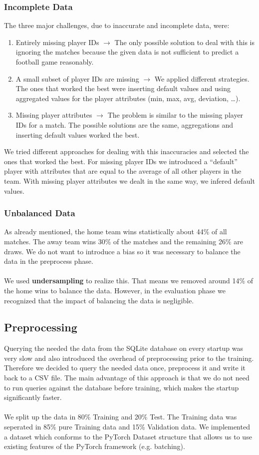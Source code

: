 \documentclass[a4paper]{article}
\begin{document}
\subsubsection{Incomplete Data}
The three major challenges, due to inaccurate and incomplete data, were:
\begin{enumerate}
  \item Entirely missing player IDs $\rightarrow$ The only possible solution to
  deal with this is ignoring the matches because the given data is not
  sufficient to predict a football game reasonably.
  \item A small subset of player IDs are missing $\rightarrow$ We applied
  different strategies. The ones that worked the best were inserting default
  values and using aggregated values for the player attributes (min, max, avg,
  deviation, \ldots).
  \item Missing player attributes $\rightarrow$ The problem is similar to the
  missing player IDs for a match. The possible solutions are the same,
  aggregations and inserting default values worked the best.
\end{enumerate}
We tried different approaches for dealing with this inaccuracies and selected
the ones that worked the best. For missing player IDs we introduced a
``default'' player with attributes that are equal to the average of all other
players in the team. With missing player attributes we dealt in the same way, we
infered default values.

\subsubsection{Unbalanced Data}
As already mentioned, the home team wins statistically about 44\% of all
matches. The away team wins 30\% of the matches and the remaining 26\% are
draws. We do not want to introduce a bias so it was necessary to balance the
data in the preprocess phase.
\\\\
We used \textbf{undersampling} to realize this. That means we removed around
14\% of the home wins to balance the data. However, in the evaluation phase we
recognized that the impact of balancing the data is negligible.

\subsection{Preprocessing}
Querying the needed the data from the SQLite database on every startup was very
slow and also introduced the overhead of preprocessing prior to the training.
Therefore we decided to query the needed data once, preprocess it and write it
back to a CSV file. The main advantage of this approach is that we do not need
to run queries against the database before training, which makes the startup
significantly faster.
\\\\
We split up the data in 80\% Training and 20\% Test. The Training data was
seperated in 85\% pure Training data and 15\% Validation data. We implemented a
dataset which conforms to the PyTorch Dataset structure that allows us to use
existing features of the PyTorch framework (e.g. batching).
\end{document}
